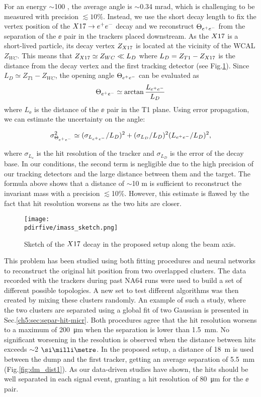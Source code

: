 For an energy $\sim$100 \gev, the average angle is $\sim$0.34 mrad, which is challenging to be measured with precision $\lesssim 10\%$. Instead, we use the short decay length to fix the vertex position of the $X17 \rightarrow e^+ e^-$ decay and we reconstruct $\Theta_{ e^+e^-}$ from the separation of the $\ee$ pair in the trackers placed downstream. As the $X17$ is a short-lived particle, its decay vertex $Z_{X17}$ is located at the vicinity of the WCAL $Z_{WC}$. This means that $Z_{X17} \simeq Z_{WC} \ll L_D$ where $L_D=Z_{T1}-Z_{X17}$ is the distance from the decay vertex and the first tracking detector (see Fig.\ref{fig:imass_sketch}). Since $L_D \simeq Z_{T1} - Z_{WC}$, the opening angle $\Theta_{ e^+e^-}$ can be evaluated as 
\begin{equation}
\Theta_{ e^+e^-} \simeq \arctan{\frac{ L_{e^+e^-}}{L_D}}
\label{angle-est}
\end{equation}
where $L_{\ee}$ is the distance of the $\ee$ pair in the T1 plane. Using error propagation, we can estimate the uncertainty on the angle:

\begin{equation}
  \sigma^2_{\Theta_{ e^+e^-}} \simeq (\sigma_{L_{e^+e^-}}  / L_D)^2 + (\sigma_{L_D} / L_D)^2(L_{e^+e^-} / L_D)^2,
  \label{eqn:thetaerr}
\end{equation}

where $\sigma_{L_{\ee}}$ is the hit resolution of the tracker and $\sigma_{L_D}$ is the error of the decay base. In our conditions, the second term is negligible due to the high precision of our tracking detectors and the large distance between them and the target. The formula above shows that a distance of $\sim$10 m is sufficient to reconstruct the invariant mass with a precision $\lesssim$10\%. However, this estimate is flawed by the fact that hit resolution worsens as the two hits are closer.

\begin{figure}[bth!]
  \centering
  \texttt{[image: \\pdirfive/imass\_sketch.png]}
  \caption[Invariant mass reconstruction sketch]{Sketch of the $X17$ decay in the proposed setup along the beam axis.}
  \label{fig:imass_sketch}
\end{figure}


This problem has been studied using both fitting procedures and neural networks to reconstruct the original hit position from two overlapped clusters. The data recorded with the trackers during past NA64 runs were used to build a set of different possible topologies. A new set to test different algorithms was then created by mixing these clusters randomly. An example of such a study, where the two clusters are separated using a global fit of two Gaussian is presented in Sec.\ref{ch5:sec:separ-hit-micr}. Both procedures agree that the hit resolution worsens to a maximum of \SI{200}{\micro\meter} when the separation is lower than \SI{1.5}{mm}. No significant worsening in the resolution is observed when the distance between hits exceeds $\sim$2 $\mmi$. In the proposed setup, a distance of \SI{18}{m} is used between the dump and the first tracker, getting an average separation of \SI{5.5}{mm} (Fig.\ref{fig:dm_dist1}). As our data-driven studies have shown, the hits should be well separated in each signal event, granting a hit resolution of \SI{80}{\micro\meter} for the $\ee$ pair.

